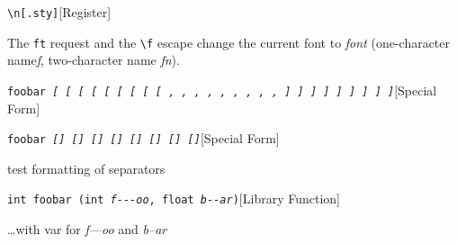 \documentclass{book}
\begin{document}
%
\noindent\texttt{\texttt{\textbackslash{}n[.sty]}}\hfill[Register]



%
The \texttt{ft} request and the \texttt{\textbackslash{}f} escape change the current font
to \textsl{font} (one-character name\hbox{}\textsl{f}, two-character name
\textsl{fn}).

\noindent\texttt{foobar \EmbracOn{}\textsl{[ \EmbracOff{}\textnormal{[}\EmbracOn{} \EmbracOff{}\textsl{[}\EmbracOn{} \EmbracOff{}\texttt{[}\EmbracOn{} \EmbracOff{}\texttt{[}\EmbracOn{} \EmbracOff{}\textnormal{\textsl{[}}\EmbracOn{} \EmbracOff{}\textnormal{\texttt{[}}\EmbracOn{} \EmbracOff{}\textnormal{\texttt{\textsl{[}}}\EmbracOn{} \EmbracOff{}\textnormal{\texttt{[}}\EmbracOn{} , \EmbracOff{}\textnormal{,}\EmbracOn{} \EmbracOff{}\textsl{,}\EmbracOn{} \EmbracOff{}\texttt{,}\EmbracOn{} \EmbracOff{}\texttt{,}\EmbracOn{} \EmbracOff{}\textnormal{\textsl{,}}\EmbracOn{} \EmbracOff{}\textnormal{\texttt{,}}\EmbracOn{} \EmbracOff{}\textnormal{\texttt{\textsl{,}}}\EmbracOn{} \EmbracOff{}\textnormal{\texttt{,}}\EmbracOn{} ] \EmbracOff{}\textnormal{]}\EmbracOn{} \EmbracOff{}\textsl{]}\EmbracOn{} \EmbracOff{}\texttt{]}\EmbracOn{} \EmbracOff{}\texttt{]}\EmbracOn{} \EmbracOff{}\textnormal{\textsl{]}}\EmbracOn{} \EmbracOff{}\textnormal{\texttt{]}}\EmbracOn{} \EmbracOff{}\textnormal{\texttt{\textsl{]}}}\EmbracOn{} \EmbracOff{}\textnormal{\texttt{]}}\EmbracOn{}}}\hfill[Special Form]



%
\noindent\texttt{foobar \EmbracOn{}\textsl{[] \EmbracOff{}\textnormal{[]}\EmbracOn{} \EmbracOff{}\textsl{[]}\EmbracOn{} \EmbracOff{}\texttt{[]}\EmbracOn{} \EmbracOff{}\texttt{[]}\EmbracOn{} \EmbracOff{}\textnormal{\textsl{[]}}\EmbracOn{} \EmbracOff{}\textnormal{\texttt{[]}}\EmbracOn{} \EmbracOff{}\textnormal{\texttt{\textsl{[]}}}\EmbracOn{}}}\hfill[Special Form]



%
test formatting of separators

\noindent\texttt{int foobar (int \textsl{f{-}{-}{-}oo}, float \textsl{b{-}{-}ar})}\hfill[Library Function]



%
\dots{}\@ with var for \textsl{f---oo} and \textsl{b--ar}
\end{document}
